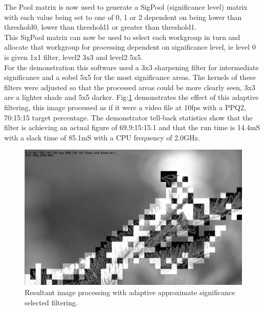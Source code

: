 \documentclass[journal]{IEEEtran}
\begin{document}
The Pool matrix is now used to generate a SigPool (significance level) matrix  with each value being set to one of 0, 1 or 2 dependent on being lower than threshold0, lower than threshold1 or greater than threshold1.\\
This SigPool matrix can now be used to select each workgroup in turn and allocate that workgroup for processing dependent on significance level, ie level 0 is given 1x1 filter, level2 3x3 and level2 5x5.\\ 
For the demonstration this software used a 3x3 sharpening filter for intermediate significance and a sobel 5x5 for the most significance areas. The kernels of these filters were adjusted so that the processed areas could be more clearly seen, 3x3 are a lighter shade and 5x5 darker. Fig:\ref{fig:AdaptiveFilt} demonstrates the effect of this adaptive filtering, this image processed as if it were a video file at 10fps with a PPQ2, 70:15:15  target percentage. The demonstrator tell-back statistics show that the filter is achieving an actual figure of 69.9:15:15.1 and that the run time is 14.4mS with a slack time of 85.1mS with a CPU frequency of 2.0GHz.\\
\begin{figure}[htb]
  \centering
   \includegraphics[width=1.0\columnwidth]{CedarWaxAdaptFilt801010}
   \caption{Resultant image processing with adaptive approximate significance selected filtering.} 
  \label{fig:AdaptiveFilt}
\end{figure} \\
\end{document}
